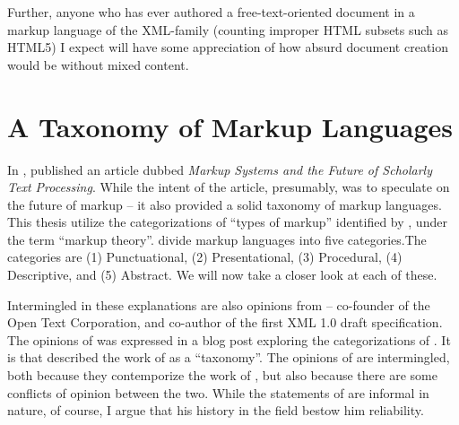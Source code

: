 \documentclass{scrreprt}
\begin{document}
Further, anyone who has ever authored a free-text-oriented document in a markup language of the XML-family (counting improper HTML subsets such as HTML5) I expect will have some appreciation of how absurd document creation would be without mixed content.





% 






\section{A Taxonomy of Markup Languages}
\label{sec:taxonomy}
In \citeyear{coombs}, \citeauthor*{coombs} published an article dubbed \textit{Markup Systems and the Future of Scholarly Text Processing}. While the intent of the article, presumably, was to speculate on the future of markup -- it also provided a solid taxonomy of markup languages. This thesis utilize the categorizations of ``types of markup'' identified by \citet{coombs}, under the term ``markup theory''. \citet{coombs} divide markup languages into five categories.The categories are (1) Punctuational, (2) Presentational, (3) Procedural, (4) Descriptive, and (5) Abstract. We will now take a closer look at each of these.

Intermingled in these explanations are also opinions from \citet{bray} -- co-founder of the Open Text Corporation, and co-author of the first XML 1.0 draft specification. The opinions of \citeauthor{bray} was expressed in a blog post exploring the categorizations of \citet{coombs}. It is \citeauthor{bray} that described the work of \citeauthor{coombs} as a ``taxonomy''. The opinions of \citeauthor{bray} are intermingled, both because they contemporize the work of \citeauthor{coombs}, but also because there are some conflicts of opinion between the two. While the statements of \citeauthor{bray} are informal in nature, of course, I argue that his history in the field bestow him reliability.
\end{document}
